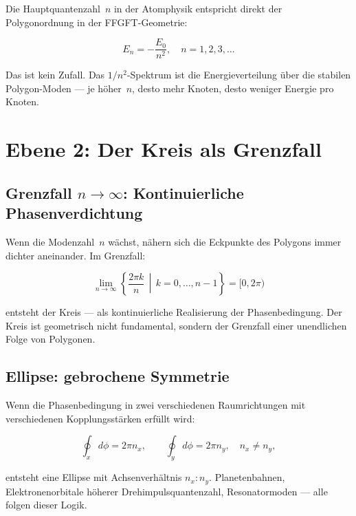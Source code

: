 Die Hauptquantenzahl~$n$ in der Atomphysik entspricht direkt der
Polygonordnung in der FFGFT-Geometrie:

\begin{equation}
  E_n = -\frac{E_0}{n^2}, \quad n = 1, 2, 3, \ldots
\end{equation}

Das ist kein Zufall. Das $1/n^2$-Spektrum ist die Energieverteilung
über die stabilen Polygon-Moden — je höher~$n$, desto mehr Knoten,
desto weniger Energie pro Knoten.

\section{Ebene 2: Der Kreis als Grenzfall}

\subsection{Grenzfall \texorpdfstring{$n \to \infty$}{n gegen unendlich}: Kontinuierliche Phasenverdichtung}

Wenn die Modenzahl~$n$ wächst, nähern sich die Eckpunkte des Polygons
immer dichter aneinander. Im Grenzfall:

\begin{equation}
  \lim_{n \to \infty} \left\{ \frac{2\pi k}{n} \,\middle|\,
  k = 0,\ldots,n-1 \right\} = [0, 2\pi)
\end{equation}

entsteht der Kreis — als kontinuierliche Realisierung der Phasenbedingung.
Der Kreis ist geometrisch nicht fundamental, sondern der Grenzfall einer
unendlichen Folge von Polygonen.

\subsection{Ellipse: gebrochene Symmetrie}

Wenn die Phasenbedingung in zwei verschiedenen Raumrichtungen mit
verschiedenen Kopplungsstärken erfüllt wird:

\begin{equation}
  \oint_x d\phi = 2\pi n_x, \qquad
  \oint_y d\phi = 2\pi n_y, \quad n_x \neq n_y,
\end{equation}

entsteht eine Ellipse mit Achsenverhältnis $n_x : n_y$. Planetenbahnen,
Elektronenorbitale höherer Drehimpulsquantenzahl, Resonatormoden —
alle folgen dieser Logik.

